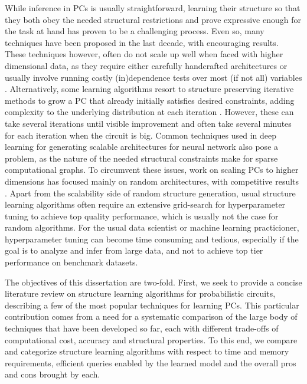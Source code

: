 While inference in PCs is usually straightforward, learning their structure so that they both
obey the needed structural restrictions and prove expressive enough for the task at hand has proven
to be a challenging process. Even so, many techniques have been proposed in the last decade, with
encouraging results. These techniques however, often do not scale up well when faced with higher
dimensional data, as they require either carefully handcrafted architectures
\citep{poon11,cheng14,nath16} or usually involve running costly (in)dependence tests over most (if
not all) variables \citep{gens13,jaini18a,vergari15,dimauro17a}. Alternatively, some learning
algorithms resort to structure preserving iterative methods to grow a PC that already initially
satisfies desired constraints, adding complexity to the underlying distribution at each iteration
\citep{liang17,dang20}. However, these can take several iterations until visible improvement and
often take several minutes for each iteration when the circuit is big. Common techniques used in
deep learning for generating scalable architectures for neural network also pose a problem, as the
nature of the needed structural constraints make for sparse computational graphs. To circumvent
these issues, work on scaling PCs to higher dimensions has focused mainly on random architectures,
with competitive results \citep{peharz20a,dimauro21,geh21a,peharz20b}. Apart from the scalability
side of random structure generation, usual structure learning algorithms often require an extensive
grid-search for hyperparameter tuning to achieve top quality performance, which is usually not the
case for random algorithms. For the usual data scientist or machine learning practicioner,
hyperparameter tuning can become time consuming and tedious, especially if the goal is to analyze
and infer from large data, and not to achieve top tier performance on benchmark datasets.

The objectives of this dissertation are two-fold. First, we seek to provide a concise literature
review on structure learning algorithms for probabilistic circuits, describing a few of the most
popular techniques for learning PCs. This particular contribution comes from a need for a
systematic comparison of the large body of techniques that have been developed so far, each with
different trade-offs of computational cost, accuracy and structural properties. To this end, we
compare and categorize structure learning algorithms with respect to time and memory requirements,
efficient queries enabled by the learned model and the overall pros and cons brought by each.

